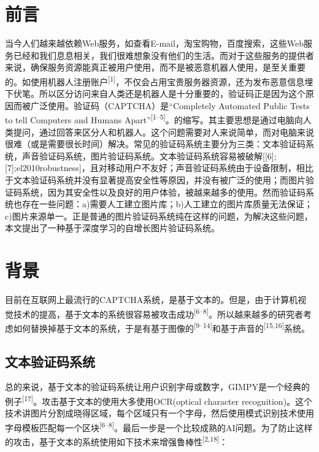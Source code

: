 \documentclass[bachelor,zhspacing]{cqu}  %
\begin{document}


\section{前言}\label{ux524dux8a00}

当今人们越来越依赖Web服务，如查看E-mail，淘宝购物，百度搜索，这些Web服务已经和我们息息相关，我们很难想象没有他们的生活。而对于这些服务的提供者来说，确保服务资源能真正被用户使用，而不是被恶意机器人使用，是至关重要的。如使用机器人注册账户\textsuperscript{{[}1{]}}，不仅会占用宝贵服务器资源，还为发布恶意信息埋下伏笔。所以区分访问来自人类还是机器人是十分重要的，验证码正是因为这个原因而被广泛使用。验证码（CAPTCHA）是``Completely
Automated Public Tests to tell Computers and Humans
Apart''\textsuperscript{{[}1--5{]}}。的缩写。其主要思想是通过电脑向人类提问，通过回答来区分人和机器人。这个问题需要对人来说简单，而对电脑来说很难（或是需要很长时间）解决。常见的验证码系统主要分为三类：文本验证码系统，声音验证码系统，图片验证码系统。文本验证码系统容易被破解{[}{[}6{]};{[}7{]};el2010robustness{]}，且对移动用户不友好；声音验证码系统由于设备限制，相比于文本验证码系统并没有显著提高安全性等原因，并没有被广泛的使用；而图片验证码系统，因为其安全性以及良好的用户体验，被越来越多的使用。然而验证码系统也存在一些问题：a)需要人工建立图片库；b)人工建立的图片库质量无法保证；c)图片来源单一。正是普通的图片验证码系统纯在这样的问题，为解决这些问题，本文提出了一种基于深度学习的自增长图片验证码系统。

\section{背景}\label{ux80ccux666f}

目前在互联网上最流行的CAPTCHA系统，是基于文本的。但是，由于计算机视觉技术的提高，基于文本的系统很容易被攻击成功\textsuperscript{{[}6--8{]}}。所以越来越多的研究者考虑如何替换掉基于文本的系统，于是有基于图像的\textsuperscript{{[}9--14{]}}和基于声音的\textsuperscript{{[}15,16{]}}系统。

\subsection{文本验证码系统}\label{ux6587ux672cux9a8cux8bc1ux7801ux7cfbux7edf}

总的来说，基于文本的验证码系统让用户识别字母或数字，GIMPY是一个经典的例子\textsuperscript{{[}17{]}}。攻击基于文本的使用大多使用OCR(optical
character
recognition)。这个技术讲图片分割成晓得区域，每个区域只有一个字母，然后使用模式识别技术使用字母模板匹配每一个区块\textsuperscript{{[}6--8{]}}。最后一步是一个比较成熟的AI问题。为了防止这样的攻击，基于文本的系统使用如下技术来增强鲁棒性\textsuperscript{{[}2,18{]}}：
\end{document}
